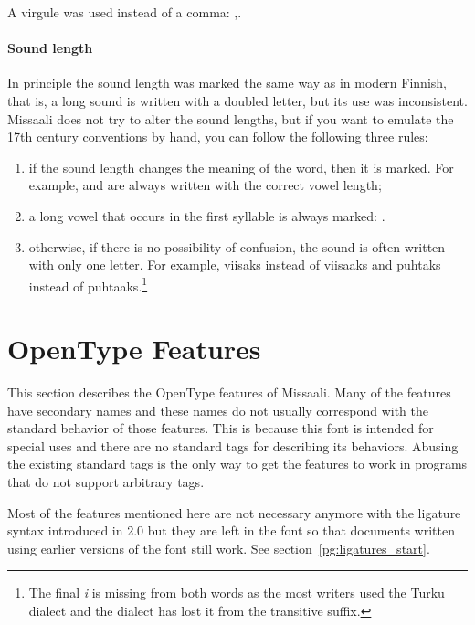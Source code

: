 \documentclass[a4paper, 12pt]{article}
\begin{document}
A virgule was used instead of a comma: {,}.

\paragraph{Sound length}

In principle the sound length was marked the same way as in modern
Finnish, that is, a long sound is written with a doubled letter, but
its use was inconsistent. Missaali does not try to alter the sound
lengths, but if you want to emulate the 17th century conventions by
hand, you can follow the following three rules:

\begin{enumerate}
\item if the sound length changes the meaning of the word, then it is
  marked. For example,  and  are
  always written with the correct vowel length; 

\item a long vowel that occurs in the first syllable is always marked:
  . 

\item otherwise, if there is no possibility of confusion, the sound is
  often written with only one letter. For example,
  {viisaks} instead of
  {viisaaks} and
  {puhtaks} instead of
  {puhtaaks}.\footnote{The final \emph{i} is
    missing from both words as the most writers used the Turku dialect
    and the dialect has lost it from the transitive suffix.}
\end{enumerate}


\section{OpenType Features}
\label{pg:features_start}

This section describes the OpenType features of Missaali. Many of the
features have secondary names and these names do not usually
correspond with the standard behavior of those features. This is
because this font is intended for special uses and there are no
standard tags for describing its behaviors. Abusing the existing
standard tags is the only way to get the features to work in programs
that do not support arbitrary tags.

Most of the features mentioned here are not necessary anymore with the
ligature syntax introduced in \Missaali{} 2.0 but they are left in the
font so that documents written using earlier versions of the font
still work.  See section~\ref{pg:ligatures_start}.
\end{document}
